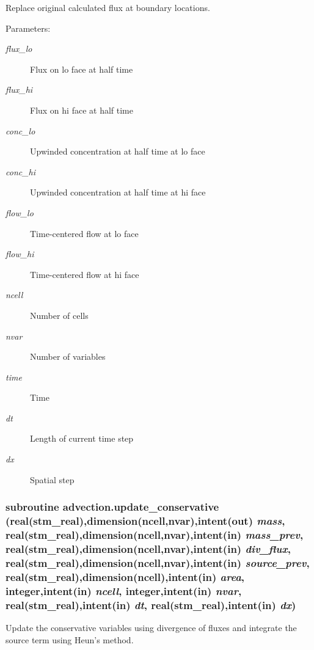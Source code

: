 Replace original calculated flux at boundary locations. 

\begin{Desc}
\item[Parameters:]
\begin{description}
\item[{\em flux\_\-lo}]Flux on lo face at half time\item[{\em flux\_\-hi}]Flux on hi face at half time\item[{\em conc\_\-lo}]Upwinded concentration at half time at lo face\item[{\em conc\_\-hi}]Upwinded concentration at half time at hi face\item[{\em flow\_\-lo}]Time-centered flow at lo face\item[{\em flow\_\-hi}]Time-centered flow at hi face\item[{\em ncell}]Number of cells\item[{\em nvar}]Number of variables\item[{\em time}]Time\item[{\em dt}]Length of current time step\item[{\em dx}]Spatial step \end{description}
\end{Desc}
\hypertarget{a00049_3785ecc18bdbada28d0be139c7839690}{
\subsubsection[{update\_\-conservative}]{\setlength{\rightskip}{0pt plus 5cm}subroutine advection.update\_\-conservative (real(stm\_\-real),dimension(ncell,nvar),intent(out) {\em mass}, \/  real(stm\_\-real),dimension(ncell,nvar),intent(in) {\em mass\_\-prev}, \/  real(stm\_\-real),dimension(ncell,nvar),intent(in) {\em div\_\-flux}, \/  real(stm\_\-real),dimension(ncell,nvar),intent(in) {\em source\_\-prev}, \/  real(stm\_\-real),dimension(ncell),intent(in) {\em area}, \/  integer,intent(in) {\em ncell}, \/  integer,intent(in) {\em nvar}, \/  real(stm\_\-real),intent(in) {\em dt}, \/  real(stm\_\-real),intent(in) {\em dx})}}
\label{a00049_3785ecc18bdbada28d0be139c7839690}


Update the conservative variables using divergence of fluxes and integrate the source term using Heun's method. 

